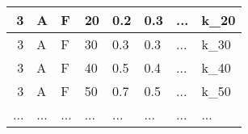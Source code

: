 \documentclass[a4paper,12pt]{article}
\begin{document}
\begin{table}[]
\begin{tabular}{|r|L|L|L|L|L|L|L|}
3                                      & A                                         & F                                   &  20                                & 0.2                               & 0.3                               & ...                                 & k_{20}                            \\ \hline
{} 
3                                      & A                                         & F                                   &  30                                & 0.3                               & 0.3                               & ...                                 & k_{30}                            \\ \hline
{} 
3                                      & A                                         & F                                   &  40                                & 0.5                               & 0.4                               & ...                                 & k_{40}                            \\ \hline
{} 
3                                      & A                                         & F                                   &  50                                & 0.7                               & 0.5                               & ...                                 & k_{50}                            \\ \hline
...                               & ...                               & ...                               & ...                               & ...                               & ...                               & ...                                 & ...                                \\ \hline
 
\end{tabular}
\end{table}
\end{document}
